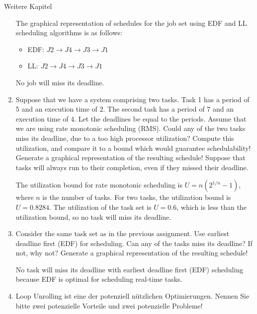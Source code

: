 \documentclass{article}
\begin{document}
\begin{exercise}{Weitere Kapitel}
\begin{enumerate}
          \begin{solution}
            The graphical representation of schedules for the job set using EDF and LL scheduling algorithms is as follows:
            \begin{itemize}
              \item EDF: $J2 \rightarrow J4 \rightarrow J3 \rightarrow J1$
              \item LL: $J2 \rightarrow J4 \rightarrow J3 \rightarrow J1$
            \end{itemize}
            No job will miss its deadline.
          \end{solution}

    \item Suppose that we have a system comprising two tasks. Task 1 has a period of 5 and an execution time of 2. The second task has a period of 7 and an execution time of 4. Let the deadlines be equal to the periods. Assume that we are using rate monotonic scheduling (RMS). Could any of the two tasks miss its deadline, due to a too high processor utilization? Compute this utilization, and compare it to a bound which would guarantee schedulability! Generate a graphical representation of the resulting schedule! Suppose that tasks will always run to their completion, even if they missed their deadline.

          \begin{solution}
            The utilization bound for rate monotonic scheduling is $U = n(2^{1/n} - 1)$, where $n$ is the number of tasks. For two tasks, the utilization bound is $U = 0.8284$. The utilization of the task set is $U = 0.6$, which is less than the utilization bound, so no task will miss its deadline.
          \end{solution}

    \item Consider the same task set as in the previous assignment. Use earliest deadline first (EDF) for scheduling. Can any of the tasks miss its deadline? If not, why not? Generate a graphical representation of the resulting schedule!

          \begin{solution}
            No task will miss its deadline with earliest deadline first (EDF) scheduling because EDF is optimal for scheduling real-time tasks.
          \end{solution}

    \item Loop Unrolling ist eine der potenziell nützlichen Optimierungen. Nennen Sie bitte zwei potenzielle Vorteile und zwei potenzielle Probleme!


\end{enumerate}
\end{exercise}
\end{document}
